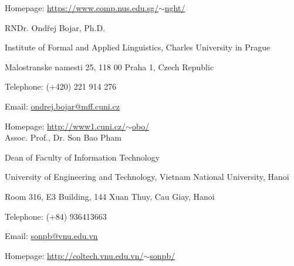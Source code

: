 \documentclass[9pt]{extreport}
\begin{document}
Homepage: \href{https://www.comp.nus.edu.sg/$\sim$nght/}{https://www.comp.nus.edu.sg/$\sim$nght/}
%

RNDr. Ond\v{r}ej Bojar, Ph.D.

Institute of Formal and Applied Linguistics, Charles University in Prague

Malostranske namesti 25, 118 00 Praha 1, Czech Republic

Telephone: (+420) 221 914 276

Email: \href{mailto:ondrej.bojar@mff.cuni.cz}{ondrej.bojar@mff.cuni.cz}

Homepage: \href{http://www1.cuni.cz/~obo/}{http://www1.cuni.cz/$\sim$obo/} \\
%

Assoc. Prof., Dr. Son Bao Pham 

Dean of Faculty of Information Technology

University of Engineering and Technology, Vietnam National University, Hanoi

Room 316, E3 Building, 144 Xuan Thuy, Cau Giay, Hanoi

Telephone: (+84) 936413663

Email: \href{mailto:sonpb@vnu.edu.vn}{sonpb@vnu.edu.vn}

Homepage: \href{http://coltech.vnu.edu.vn/\~sonpb/}{http://coltech.vnu.edu.vn/$\sim$sonpb/} \\ 

\bigskip




\end{document}

